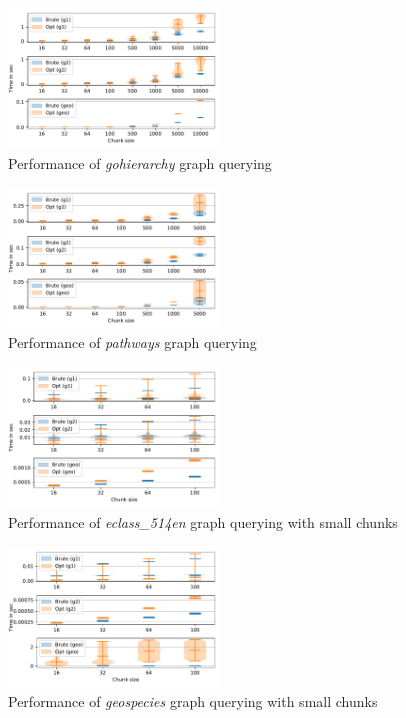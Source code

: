 \begin{figure}[h]
\centering
\includegraphics[width=0.5\textwidth]{data/raw/gohierarchy.pdf}
\caption{Performance of \textit{gohierarchy} graph querying}
\label{fig:python_gohierarchy_all}
\end{figure}


\begin{figure}[h]
\centering
\includegraphics[width=0.5\textwidth]{data/raw/pathways.pdf}
\caption{Performance of \textit{pathways} graph querying}
\label{fig:python_pathways_all}
\end{figure}

\begin{figure}[h]
\centering
\includegraphics[width=0.5\textwidth]{data/raw/eclass_514en_4.pdf}
\caption{Performance of \textit{eclass\_514en} graph querying with small chunks}
\label{fig:python_eclass_small}
\end{figure}

\begin{figure}[h]
\centering
\includegraphics[width=0.5\textwidth]{data/raw/geospecies_4.pdf}
\caption{Performance of \textit{geospecies} graph querying with small chunks}
\label{fig:python_geospecies_small}
\end{figure}

